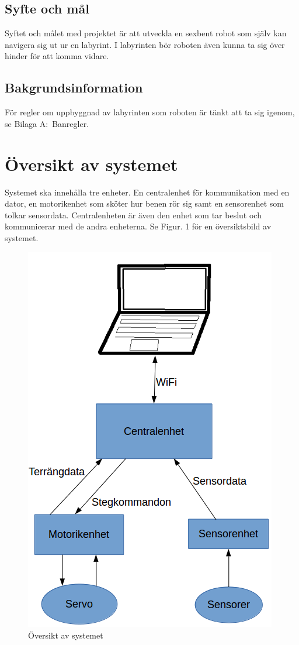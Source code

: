 \documentclass[a4paper,titlepage,12pt]{article}
\begin{document}
	\subsection{Syfte och mål}
	Syftet och målet med projektet är att utveckla en sexbent robot som själv
	kan navigera sig ut ur en labyrint. I labyrinten bör roboten även kunna ta 
	sig över hinder för att komma vidare. 
	\subsection{Bakgrundsinformation}
	För regler om uppbyggnad av labyrinten som roboten är tänkt att ta sig igenom, se
	Bilaga A:\ Banregler.


  \newpage
	\section{Översikt av systemet}
	Systemet ska innehålla tre enheter. En centralenhet för kommunikation med en dator, en motorikenhet
	som sköter hur benen rör sig samt en sensorenhet som tolkar sensordata. Centralenheten är även den enhet som
	tar beslut och kommunicerar med de andra enheterna. Se Figur. 1 för en översiktsbild av systemet.
	\begin{figure}[h]
		\centering
		\includegraphics[width=0.5\linewidth]{../images/overview.png}
		\caption{Översikt av systemet\label{fig:overview}}
	\end{figure}
\end{document}
